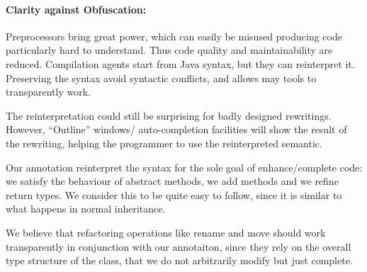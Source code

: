 \paragraph{Clarity against Obfuscation:}
Preprocessors bring great power, which can easily be misused producing
code particularly hard to understand. Thus code quality and maintainability are reduced.
Compilation agents start from Java syntax, but they can reinterpret it.
Preserving the syntax avoid syntactic conflicts, and allows may tools to transparently work.

The reinterpretation could still be surprising for badly designed rewritings.
However, ``Outline'' windows/ auto-completion facilities 
will show the result of the rewriting, helping the programmer to use the reinterpreted semantic.

Our annotation reinterpret the syntax for the sole goal of enhance/complete code:
we satisfy the behaviour of abstract methods, we add methods and we refine return types.
We consider this to be quite easy to follow, since it is similar to what happens in normal inheritance.

We believe that refactoring operations like rename and move
should work transparently in conjunction with our annotaiton, since they rely on 
the overall type structure of the class, that we do not arbitrarily modify but just complete.



